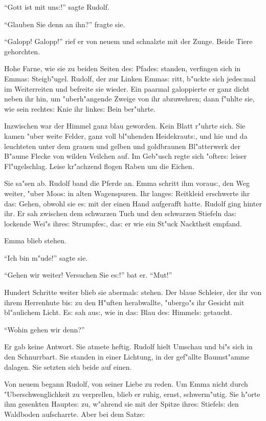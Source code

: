 \documentclass[oneside,12pt]{book}
\newcommand{\s}{s:}%
\begin{document}
"`Gott ist mit un{\s}!"' sagte Rudolf.

"`Glauben Sie denn an ihn?"' fragte sie.

"`Galopp! Galopp!"' rief er von neuem und schnalzte mit der Zunge.
Beide Tiere gehorchten.

Hohe Farne, wie sie zu beiden Seiten de{\s} Pfade{\s} standen,
verfingen sich in Emma{\s} Steigb"ugel. Rudolf, der zur Linken
Emma{\s} ritt, b"uckte sich jede{\s}mal im Weiterreiten und
befreite sie wieder. Ein paarmal galoppierte er ganz dicht neben
ihr hin, um "uberh"angende Zweige von ihr abzuwehren; dann f"uhlte
sie, wie sein rechte{\s} Knie ihr linke{\s} Bein ber"uhrte.

Inzwischen war der Himmel ganz blau geworden. Kein Blatt r"uhrte
sich. Sie kamen "uber weite Felder, ganz voll bl"uhenden
Heidekraut{\s}, und hie und da leuchteten unter dem grauen und
gelben und goldbraunen Bl"atterwerk der B"aume Flecke von wilden
Veilchen auf. Im Geb"usch regte sich "ofter{\s} leiser
Fl"ugelschlag. Leise kr"achzend flogen Raben um die Eichen.

Sie sa"sen ab. Rudolf band die Pferde an. Emma schritt ihm
vorau{\s}, den Weg weiter, "uber Moo{\s} in alten Wagenspuren. Ihr
lange{\s} Reitkleid erschwerte ihr da{\s} Gehen, obwohl sie e{\s}
mit der einen Hand aufgerafft hatte. Rudolf ging hinter ihr. Er
sah zwischen dem schwarzen Tuch und den schwarzen Stiefeln da{\s}
lockende Wei"s ihre{\s} Strumpfe{\s}, da{\s} er wie ein St"uck
Nacktheit empfand.

Emma blieb stehen.

"`Ich bin m"ude!"' sagte sie.

"`Gehen wir weiter! Versuchen Sie e{\s}!"' bat er. "`Mut!"'

Hundert Schritte weiter blieb sie abermal{\s} stehen. Der blaue
Schleier, der ihr von ihrem Herrenhute bi{\s} zu den H"uften
herabwallte, "ubergo"s ihr Gesicht mit bl"aulichem Licht. E{\s}
sah au{\s}, wie in da{\s} Blau de{\s} Himmel{\s} getaucht.

"`Wohin gehen wir denn?"'

Er gab keine Antwort. Sie atmete heftig. Rudolf hielt Umschau und
bi"s sich in den Schnurrbart. Sie standen in einer Lichtung, in
der gef"allte Baumst"amme dalagen. Sie setzten sich beide auf
einen.

Von neuem begann Rudolf, von seiner Liebe zu reden. Um Emma nicht
durch "Uberschwenglichkeit zu verprellen, blieb er ruhig, ernst,
schwerm"utig. Sie h"orte ihm gesenkten Haupte{\s} zu, w"ahrend sie
mit der Spitze ihre{\s} Stiefel{\s} den Waldboden aufscharrte.
Aber bei dem Satze:
\end{document}
